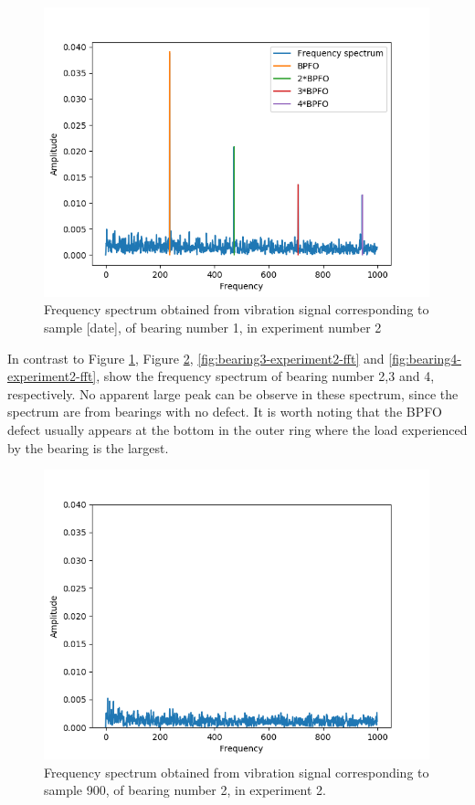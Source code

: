 \documentclass[../Main/thesis.tex]{subfiles}
\begin{document}
\begin{figure}[H] 
   \centering
   \includegraphics[width=4.4in]{../fig/experiment2_bearing1_fft.png} 
   \caption{Frequency spectrum obtained from vibration signal corresponding to sample [date], of bearing number 1,  in  experiment number 2}
   \label{fig:bearing1-experiment2-fft}
\end{figure}
\justify
In contrast to Figure \ref{fig:bearing1-experiment2-fft}, Figure \ref{fig:bearing2-experiment2-fft}, \ref{fig:bearing3-experiment2-fft} and \ref{fig:bearing4-experiment2-fft}, show  the frequency spectrum of bearing number 2,3 and 4, respectively. No apparent large peak can be observe in these spectrum, since the spectrum are from bearings with no defect. It is worth noting that the BPFO defect usually appears at the bottom in the outer ring where the load experienced by the bearing is the largest.

\begin{figure}[H] 
   \centering
   \includegraphics[width=4.4in]{../fig/experiment2_bearing2_fft.png} 
   \caption{Frequency spectrum obtained from vibration signal corresponding to sample 900, of bearing number 2, in experiment 2.}
   \label{fig:bearing2-experiment2-fft}
\end{figure}
\end{document}
